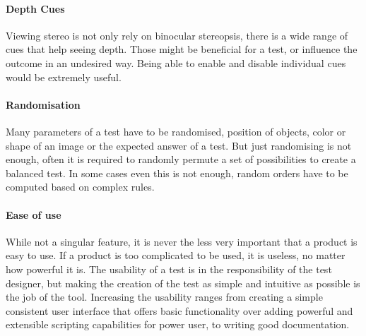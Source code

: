 \paragraph{Depth Cues}
Viewing stereo is not only rely on binocular stereopsis, there is a wide range of cues that help seeing depth.
Those might be beneficial for a test, or influence the outcome in an undesired way.
Being able to enable and disable individual cues would be extremely useful.

\paragraph{Randomisation}
Many parameters of a test have to be randomised, position of objects, color or shape of an image or the expected answer of a test.
But just randomising is not enough, often it is required to randomly permute a set of possibilities to create a balanced test.
In some cases even this is not enough, random orders have to be computed based on complex rules.

\paragraph{Ease of use}
While not a singular feature, it is never the less very important that a product is easy to use.
If a product is too complicated to be used, it is useless, no matter how powerful it is.
The usability of a test is in the responsibility of the test designer, but making the creation of the test as simple and intuitive as possible is the job of the tool.
Increasing the usability ranges from creating a simple consistent user interface that offers basic functionality over adding powerful and extensible scripting capabilities for power user, to writing good documentation.

